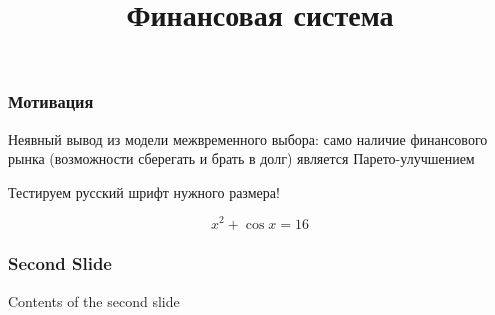 \documentclass[12pt]{beamer}
\title{Финансовая система}
\subtitle{}
\author{}
\date{}
\begin{document}
\begingroup
{}
\frame[plain]{\titlepage}
\endgroup

\begin{frame}
\frametitle{Мотивация}


Неявный вывод из модели межвременного выбора: само наличие финансового рынка 
(возможности сберегать и брать в долг) является Парето-улучшением


Тестируем русский \alert{шрифт нужного} размера!

\[
x^2 + \cos x = 16    
\]

\end{frame}

\begin{frame}
\frametitle{Second Slide}
Contents of the second slide
\end{frame}
\end{document}
